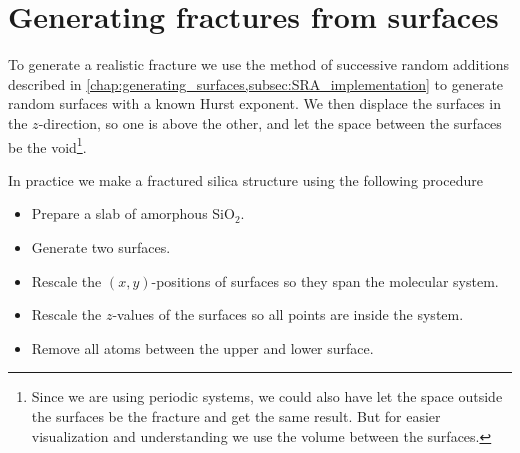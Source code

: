 
\section{Generating fractures from surfaces\label{sec:generating_fractures}}
To generate a realistic fracture we use the method of successive random additions described in \cref{chap:generating_surfaces,subsec:SRA_implementation} to generate random surfaces with a known Hurst exponent. We then displace the surfaces in the $z$-direction, so one is above the other, and let the space between the surfaces be the void\footnote{Since we are using periodic systems, we could also have let the space outside the surfaces be the fracture and get the same result. But for easier visualization and understanding we use the volume between the surfaces.}.

In practice we make a fractured silica structure using the following procedure
\begin{itemize}
    \item Prepare a slab of amorphous SiO$_2$.
    \item Generate two surfaces.
    \item Rescale the $(x,y)$-positions of surfaces so they span the molecular system.
    \item Rescale the $z$-values of the surfaces so all points are inside the system.
    \item Remove all atoms between the upper and lower surface.
\end{itemize}

